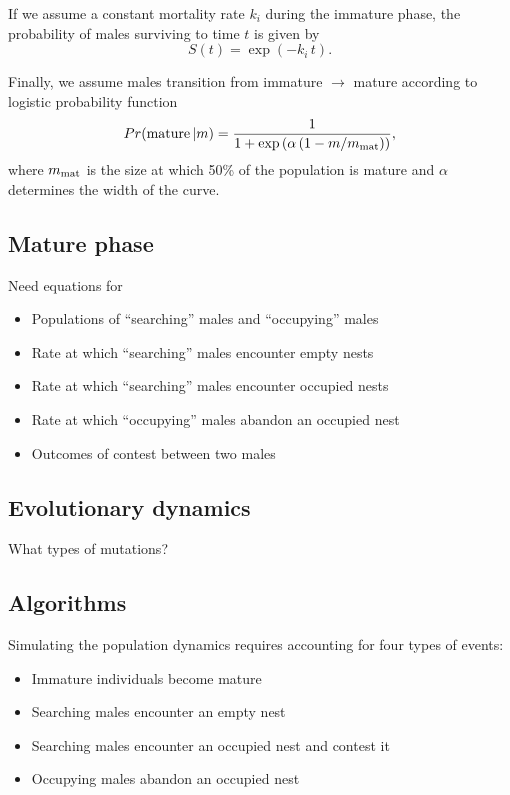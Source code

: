 \documentclass[a4paper,11pt]{article}
\begin{document}
If we assume a constant mortality rate $k_i$ during the immature phase, the probability of males surviving to time $t$ is given by
\begin{equation} \label{eq:surv_immature}
S(t) = \exp(-k_i \, t).
\end{equation}

Finally, we assume males transition from immature $\rightarrow$ mature according to logistic probability function
\begin{equation}\label{eq:allocation}
Pr({\rm mature} \, | m) = \frac1{1 + \exp\left(\alpha \left(1 - m / m_{\rm mat}\right)\right)},
\end{equation}
where $m_{\rm mat}$ is the size at which 50\% of the population is mature and $\alpha$ determines the width of the curve.

\subsection{Mature phase}

Need equations for

\begin{itemize}
    \item Populations of ``searching'' males and  ``occupying'' males
    \item Rate at which ``searching'' males encounter empty nests
    \item Rate at which ``searching'' males encounter occupied nests
    \item Rate at which ``occupying'' males abandon an occupied nest
    \item Outcomes of contest between two males
\end{itemize}

\subsection{Evolutionary dynamics}

What types of mutations?

\subsection{Algorithms}
Simulating the population dynamics requires accounting for four types of events:
\begin{itemize}
    \item Immature individuals become mature
    \item Searching males encounter an empty nest
    \item Searching males encounter an occupied nest and contest it
    \item Occupying males abandon an occupied nest
\end{itemize}
\end{document}
